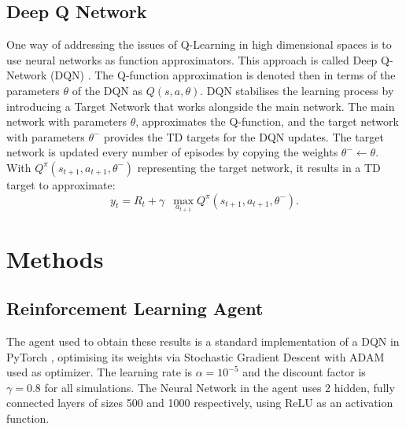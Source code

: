 \documentclass[sigconf,anonymous]{aamas}
\begin{document}
\subsection{Deep Q Network}
One way of addressing the issues of Q-Learning in high dimensional spaces is to use neural networks as function approximators. This approach is called Deep Q-Network (DQN) \cite{mnih2015}.
The Q-function approximation is denoted then in terms of the parameters $\theta$ of the DQN as $Q(s,a,\theta)$.
DQN stabilises the learning process by introducing a Target Network that works alongside the main network. 
The main network with parameters $\theta$, approximates the Q-function, and the target network with parameters $\theta^-$  provides the TD targets for the DQN updates. 
The target network is updated every number of episodes by copying the weights $\theta^- \leftarrow \theta$. With $Q^{\pi} (s_{t+1}, a_{t+1}, \theta^-)$ representing the target network, it results in a TD target to approximate:
\begin{equation}
y_t = R_t + \gamma \,\,\, \max_{a_{t+1}} Q^{\pi} (s_{t+1}, a_{t+1}, \theta^-).
\end{equation}
\section{Methods}
\label{methods}
\subsection{Reinforcement Learning Agent}
The agent used to obtain these results is a standard implementation of a DQN in PyTorch \cite{pytorch}, optimising its weights via Stochastic Gradient Descent \cite{kiefer} with ADAM \cite{adam} used as optimizer.
The learning rate is $\alpha=10^{-5}$ and the discount factor is $\gamma = 0.8$ for all simulations.
The Neural Network in the agent uses 2 hidden, fully connected layers of sizes 500 and 1000 respectively, using ReLU as an activation function.
\end{document}
